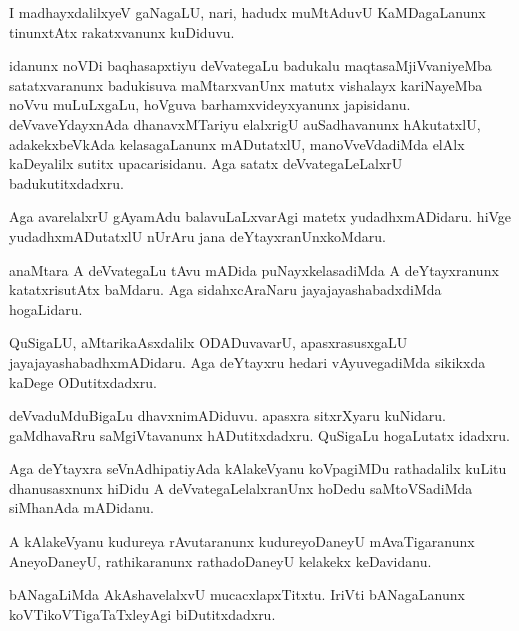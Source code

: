 \documentclass{article}
\begin{document}
\begin{mng}%
I madhayxdalilxyeV gaNagaLU, nari, hadudx muMtAduvU KaMDagaLanunx tinunxtAtx rakatxvanunx kuDiduvu. 
\end{mng}

\begin{mng}%
idanunx noVDi baqhasapxtiyu deVvategaLu badukalu maqtasaMjiVvaniyeMba satatxvaranunx badukisuva 
maMtarxvanUnx matutx vishalayx kariNayeMba noVvu muLuLxgaLu, hoVguva barhamxvideyxyanunx 
japisidanu. deVvaveYdayxnAda dhanavxMTariyu elalxrigU auSadhavanunx hAkutatxlU, adakekxbeVkAda 
kelasagaLanunx mADutatxlU, manoVveVdadiMda elAlx kaDeyalilx sutitx upacarisidanu. Aga satatx 
deVvategaLeLalxrU badukutitxdadxru.
\end{mng}

\begin{mng}%
Aga avarelalxrU gAyamAdu balavuLaLxvarAgi matetx yudadhxmADidaru. hiVge yudadhxmADutatxlU nUrAru 
jana deYtayxranUnxkoMdaru.
\end{mng}

\begin{mng}%
anaMtara A deVvategaLu tAvu mADida puNayxkelasadiMda A deYtayxranunx katatxrisutAtx baMdaru. Aga 
sidahxcAraNaru jayajayashabadxdiMda hogaLidaru.
\end{mng}

\begin{mng}%
QuSigaLU, aMtarikaAsxdalilx ODADuvavarU, apasxrasusxgaLU jayajayashabadhxmADidaru. Aga deYtayxru 
hedari vAyuvegadiMda sikikxda kaDege ODutitxdadxru.
\end{mng}

\begin{mng}%
deVvaduMduBigaLu dhavxnimADiduvu. apasxra sitxrXyaru kuNidaru. gaMdhavaRru saMgiVtavanunx 
hADutitxdadxru. QuSigaLu hogaLutatx idadxru.
\end{mng}

\begin{mng}%
Aga deYtayxra seVnAdhipatiyAda kAlakeVyanu koVpagiMDu rathadalilx kuLitu dhanusasxnunx hiDidu A 
deVvategaLelalxranUnx hoDedu saMtoVSadiMda siMhanAda mADidanu.
\end{mng}

\begin{mng}%
A kAlakeVyanu kudureya rAvutaranunx kudureyoDaneyU mAvaTigaranunx AneyoDaneyU, rathikaranunx 
rathadoDaneyU kelakekx keDavidanu.
\end{mng}

\begin{mng}%
bANagaLiMda AkAshavelalxvU mucacxlapxTitxtu. IriVti bANagaLanunx koVTikoVTigaTaTxleyAgi 
biDutitxdadxru.
\end{mng}
\end{document}
